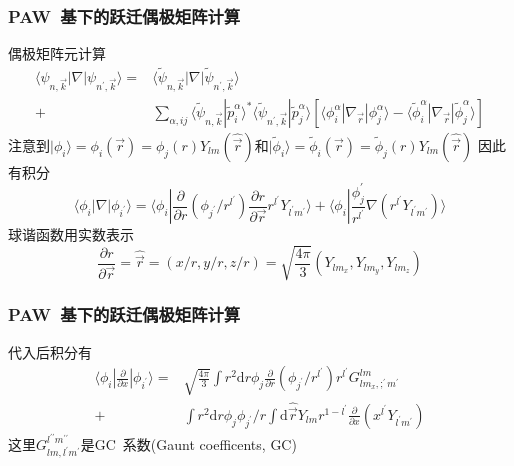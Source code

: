 \documentclass[cjk,slidestop,compress,mathserif,blue]{beamer}
\begin{document}
\frame
{
	\frametitle{\textrm{PAW~}基下的跃迁偶极矩阵计算}
	偶极矩阵元计算
	\begin{displaymath}
		\begin{aligned}
			\langle\psi_{n,\vec k}|\nabla|\psi_{n^{\prime},\vec k}\rangle=&\langle\tilde{\psi}_{n,\vec k}|\nabla|\tilde{\psi}_{n^{\prime},\vec k}\rangle\\
			+&\sum_{\alpha,ij}\langle\tilde{\psi}_{n,\vec k}|\tilde{p}_i^{\alpha}\rangle^{\ast}\langle\tilde{\psi}_{n^{\prime},\vec k}|\tilde{p}_j^{\alpha}\rangle[\langle\phi_i^{\alpha}|\nabla_{\vec r}|\phi_j^{\alpha}\rangle-\langle\tilde{\phi}_i^{\alpha}|\nabla_{\vec r}|\tilde{\phi}_j^{\alpha}\rangle]
		\end{aligned}
	\end{displaymath}
	注意到$|\phi_i\rangle=\phi_i(\vec r)=\phi_j(r)Y_{lm}(\hat{\vec r})$和$|\tilde{\phi}_i\rangle=\tilde{\phi}_i(\vec r)=\tilde{\phi}_j(r)Y_{lm}(\hat{\vec r})$
	因此有积分
	\begin{displaymath}
		\langle\phi_i|\nabla|\phi_{i^{\prime}}\rangle=\langle\phi_i|\frac{\partial}{\partial r}(\phi_{j^{\prime}}/r^{l^{\prime}})\frac{\partial r}{\partial\vec r}r^{l^{\prime}}Y_{l^{\prime}m^{\prime}}\rangle+\langle\phi_i|\frac{\phi_j^{\prime}}{r^{l^{\prime}}}\nabla(r^{l^{\prime}}Y_{l^{\prime}m^{\prime}})\rangle	
	\end{displaymath}
	球谐函数用实数表示
	\begin{displaymath}
		\frac{\partial r}{\partial\vec r}=\hat{\vec r}=(x/r,y/r,z/r)=\sqrt{\frac{4\pi}3}(Y_{lm_x},Y_{lm_y},Y_{lm_z})
	\end{displaymath}
}

\frame
{
	\frametitle{\textrm{PAW~}基下的跃迁偶极矩阵计算}
	代入后积分有
	\begin{displaymath}
		\begin{aligned}
			\langle\phi_i|\frac{\partial}{\partial x}|\phi_{i^{\prime}}\rangle=&\sqrt{\frac{4\pi}3}\int r^2\mathrm{d}r\phi_j\frac{\partial}{\partial r}(\phi_{j^{\prime}}/r^{l^{\prime}})r^{l^{\prime}}G_{lm_x,;^{\prime}m^{\prime}}^{lm}\\
			+&\int r^2\mathrm{d}r\phi_j\phi_{j^{\prime}}/r\int\mathrm{d}\hat{\vec r}Y_{lm}r^{1-l^{\prime}}\frac{\partial}{\partial x}(x^{l^{\prime}}Y_{l^{\prime}m^{\prime}})
		\end{aligned}
	\end{displaymath}
	这里$G_{lm,l^{\prime}m^{\prime}}^{l^{\prime\prime}m^{\prime\prime}}$是\textrm{GC~}系数(\textrm{Gaunt coefficents, GC})
}
\end{document}

